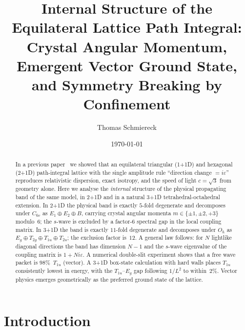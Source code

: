 \documentclass[twocolumn,showpacs,preprintnumbers,amsmath,amssymb]{revtex4-2}
\newcommand{\eps}{\varepsilon}
\newcommand{\Oh}{O_{h}}
\newcommand{\Csix}{C_{6v}}
\begin{document}
\title{Internal Structure of the Equilateral Lattice Path Integral:\\
Crystal Angular Momentum, Emergent Vector Ground State,\\
and Symmetry Breaking by Confinement}

\author{Thomas Schmiereck}

\date{\today}

\begin{abstract}
In a previous paper~\cite{schmiereck2026} we showed that an equilateral
triangular (\mbox{1\!+\!1D}) and hexagonal (\mbox{2\!+\!1D}) path-integral
lattice with the single amplitude rule ``direction change $=i\eps$'' reproduces
relativistic dispersion, exact isotropy, and the speed of light $c=\sqrt{3}$
from geometry alone.
Here we analyse the \emph{internal} structure of the physical propagating
band of the same model, in \mbox{2\!+\!1D} and in a natural
\mbox{3\!+\!1D} tetrahedral-octahedral extension.
In \mbox{2\!+\!1D} the physical band is exactly $5$-fold degenerate and
decomposes under $\Csix$ as $E_{1}\oplus E_{2}\oplus B$, carrying crystal
angular momenta $m\in\{\pm1,\pm2,+3\}$ modulo~$6$; the $s$-wave is excluded by
a factor-$6$ spectral gap in the local coupling matrix.
In \mbox{3\!+\!1D} the band is exactly $11$-fold degenerate and decomposes
under $\Oh$ as $E_{g}\oplus T_{2g}\oplus T_{1u}\oplus T_{2u}$; the exclusion
factor is~$12$.
A general law follows: for $N$ lightlike diagonal directions the band has
dimension $N-1$ and the $s$-wave eigenvalue of the coupling matrix is
$1+Ni\eps$.
A numerical double-slit experiment shows that a free wave packet is
$98\%$~$T_{1u}$ (vector).
A \mbox{3\!+\!1D} box-state calculation with hard walls places $T_{1u}$
consistently lowest in energy, with the $T_{1u}$--$E_{g}$ gap following
$1/L^{2}$ to within~$2\%$.
Vector physics emerges geometrically as the preferred ground state of the
lattice.
\end{abstract}

\maketitle

\section{Introduction}
\label{sec:intro}
\end{document}
